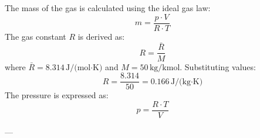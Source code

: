 The mass of the gas is calculated using the ideal gas law:  
\[
m = \frac{p \cdot V}{R \cdot T}
\]  
The gas constant \( R \) is derived as:  
\[
R = \frac{\bar{R}}{M}
\]  
where \( \bar{R} = 8.314 \, \text{J/(mol·K)} \) and \( M = 50 \, \text{kg/kmol} \). Substituting values:  
\[
R = \frac{8.314}{50} = 0.166 \, \text{J/(kg·K)}
\]  
The pressure is expressed as:  
\[
p = \frac{R \cdot T}{V}
\]  

---